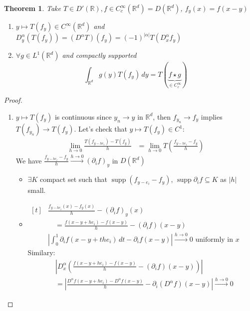 \documentclass{report}
\theoremstyle{tommy}
\newtheorem{thm}[defn]{Theorem}
\newcommand{\supp}{\operatorname{supp}}
\begin{document}
  \begin{thm}
    Take \(T \in D'(\mathbb{R}), f \in C_c^\infty(\mathbb{R}^d) = D(\mathbb{R}^d)\), \(f_y(x) = f(x-y)\)
    \begin{enumerate}[label=\alph*)]
      \item \(y \mapsto T(f_y) \in C^\infty(\mathbb{R}^d)\) and \(D_y^\alpha(T(f_y)) = (D^\alpha T) (f_y) = (-1)^{|\alpha|} T(D_x^\alpha f_y)\)
      \item \(\forall g \in L^1(\mathbb{R}^d)\) and compactly supported 
      \[\int_{\mathbb{R}^d} g(y) T(f_y) \, dy = T(\underbrace{f \star g}_{\in C_c^\infty})\]
    \end{enumerate}
  \end{thm}

  \begin{proof}
    \begin{enumerate}[label=\alph*)]
      \item \(y \mapsto T(f_y)\) is continuous since \(y_n \to y\) in \(\mathbb{R}^d\), then 
      \(f_{y_n} \to f_y\) implies \(T(f_{y_n}) \to T(f_y)\). Let's check that \(y \mapsto T(f_y) \in C^1\):
      \begin{align*}
        \lim_{h \to 0} \frac{T(f_{y-he_i})-T(f_y)}{h}
        &= \lim_{h \to 0} T \left(\frac{f_{y-he_i} - f_y}{h}\right)
      \end{align*}
        We have \(\frac{f_{y - h e_i} - f_y}{h} \xrightarrow{h \to 0} (\partial_i f)_y\) in \(D(\mathbb{R}^d)\)
      \begin{itemize}
        \item \(\exists K\) compact set such that \(\supp(f_{y - e_i} - f_y)\), \(\supp \partial_i f \subseteq K\) as \(|h|\) small.
        \item \(\begin{aligned}[t]
          &\frac{f_{y - h e_i}(x)- f_y(x)}{h} - (\partial_i f)_y(x) \\
          &\quad = \frac{f(x-y+he_i) - f(x-y)}{h} - (\partial_i f)(x-y) \\
          &\left| \int_0^1 \partial_i f(x-y+the_i) \, dt - \partial_i f(x-y) \right| \xrightarrow{h \to 0} 0 \text{ uniformly in } x
        \end{aligned}\) \\
        Similary:
        \begin{align*}
          &\left| D_x^\alpha \left(\frac{f(x-y+he_i) - f(x-y)}{h} - (\partial_i f)(x-y)\right) \right| \\
          &= \left| \frac{D^\alpha f(x-y+he_i) - D^\alpha f(x-y)}{h} - \partial_i(D^\alpha f)(x-y) \right| \xrightarrow{h \to 0} 0 

\end{align*}
\end{itemize}
\end{enumerate}
\end{proof}
\end{document}
